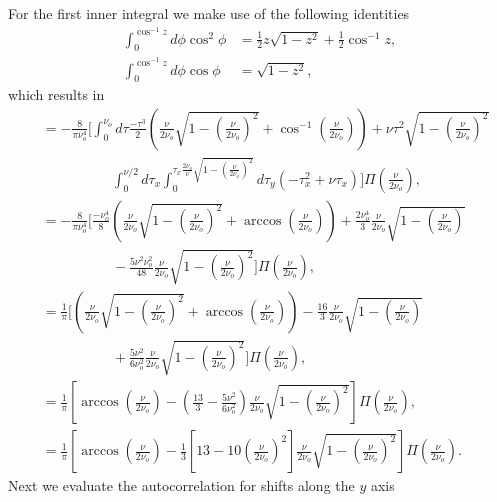 \documentclass{osa-article}
\begin{document}
For the first inner integral we make use of the following identities
\begin{align}
  \int_0^{\cos^{-1}z}d\phi\cos^2\phi &= \frac{1}{2}z\sqrt{1 - z^2} + \frac{1}{2}\cos^{-1}z,\\
  \int_0^{\cos^{-1}z}d\phi\cos\phi &= \sqrt{1 - z^2},
\end{align}
which results in
\begin{align}
  &= -\frac{8}{\pi\nu_o^{4}}\Bigg[\int_0^{\nu_o}d\tau\frac{-\tau^3}{2}\left(\frac{\nu}{2\nu_o}\sqrt{1 - \left(\frac{\nu}{2\nu_o}\right)^2} + \cos^{-1}\left(\frac{\nu}{2\nu_o}\right)\right) + \nu\tau^2\sqrt{1 - \left(\frac{\nu}{2\nu_o}\right)^2}\nonumber\\ &\hspace{5em}\int_{0}^{\nu/2}d\tau_x\int_0^{\tau_x\frac{2\nu_o}{\nu}\sqrt{1 - \left(\frac{\nu}{2\nu_o}\right)^2}}d\tau_y(-\tau_x^2 + \nu\tau_x)\Bigg]\Pi\left(\frac{\nu}{2\nu_o}\right),\\
  &=  -\frac{8}{\pi\nu_o^4}\Bigg[\frac{-\nu_o^4}{8}\left(\frac{\nu}{2\nu_o}\sqrt{1 - \left(\frac{\nu}{2\nu_o}\right)^2} + \arccos\left(\frac{\nu}{2\nu_o}\right) \right) + \frac{2\nu_o^4}{3}\frac{\nu}{2\nu_o}\sqrt{1 - \left(\frac{\nu}{2\nu_o}\right)}\nonumber \\ &\hspace{5em} - \frac{5\nu^2\nu_o^2}{48}\frac{\nu}{2\nu_o}\sqrt{1 - \left(\frac{\nu}{2\nu_o}\right)^2}\Bigg]\Pi\left(\frac{\nu}{2\nu_o}\right),\\
  &=  \frac{1}{\pi}\Bigg[\left(\frac{\nu}{2\nu_o}\sqrt{1 - \left(\frac{\nu}{2\nu_o}\right)^2} + \arccos\left(\frac{\nu}{2\nu_o}\right) \right) - \frac{16}{3}\frac{\nu}{2\nu_o}\sqrt{1 - \left(\frac{\nu}{2\nu_o}\right)}\nonumber \\ &\hspace{5em} + \frac{5\nu^2}{6\nu_o^2}\frac{\nu}{2\nu_o}\sqrt{1 - \left(\frac{\nu}{2\nu_o}\right)^2}\Bigg]\Pi\left(\frac{\nu}{2\nu_o}\right),\\
  &= \frac{1}{\pi}\left[\arccos\left(\frac{\nu}{2\nu_o}\right) - \left(\frac{13}{3} - \frac{5\nu^2}{6\nu_o^2}\right)\frac{\nu}{2\nu_o} \sqrt{1 - \left(\frac{\nu}{2\nu_o}\right)^2}\right]\Pi\left(\frac{\nu}{2\nu_o}\right),\\
  &= \frac{1}{\pi}\left[\arccos\left(\frac{\nu}{2\nu_o}\right) - \frac{1}{3}\left[13 - 10\left(\frac{\nu}{2\nu_o}\right)^2\right]\frac{\nu}{2\nu_o} \sqrt{1 - \left(\frac{\nu}{2\nu_o}\right)^2}\right]\Pi\left(\frac{\nu}{2\nu_o}\right).\label{eq:auto1}
\end{align}
Next we evaluate the autocorrelation for shifts along the $y$ axis
\end{document}

